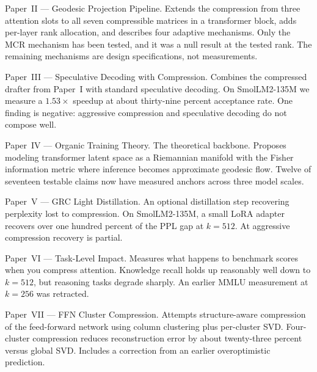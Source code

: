 \documentclass[11pt]{article}
\begin{document}
\vspace{4pt}

\noindent Paper~II --- Geodesic Projection Pipeline.
Extends the compression from three attention slots to all seven compressible
matrices in a transformer block, adds per-layer rank allocation, and describes
four adaptive mechanisms. Only the MCR mechanism has been tested, and it was a
null result at the tested rank. The remaining mechanisms are design
specifications, not measurements.

\vspace{4pt}

\noindent Paper~III --- Speculative Decoding with Compression.
Combines the compressed drafter from Paper~I with standard speculative decoding.
On SmolLM2-135M we measure a $1.53{\times}$ speedup at about thirty-nine percent
acceptance rate. One finding is negative: aggressive compression and speculative
decoding do not compose well.

\vspace{4pt}

\noindent Paper~IV --- Organic Training Theory.
The theoretical backbone. Proposes modeling transformer latent space as a
Riemannian manifold with the Fisher information metric where inference becomes
approximate geodesic flow. Twelve of seventeen testable claims now have measured
anchors across three model scales.

\vspace{4pt}

\noindent Paper~V --- GRC Light Distillation.
An optional distillation step recovering perplexity lost to compression.
On SmolLM2-135M, a small LoRA adapter recovers over one hundred percent of the
PPL gap at $k{=}512$. At aggressive compression recovery is partial.

\vspace{4pt}

\noindent Paper~VI --- Task-Level Impact.
Measures what happens to benchmark scores when you compress attention.
Knowledge recall holds up reasonably well down to $k{=}512$, but reasoning tasks
degrade sharply. An earlier MMLU measurement at $k{=}256$ was retracted.

\vspace{4pt}

\noindent Paper~VII --- FFN Cluster Compression.
Attempts structure-aware compression of the feed-forward network using column
clustering plus per-cluster SVD. Four-cluster compression reduces reconstruction
error by about twenty-three percent versus global SVD. Includes a correction
from an earlier overoptimistic prediction.
\end{document}

